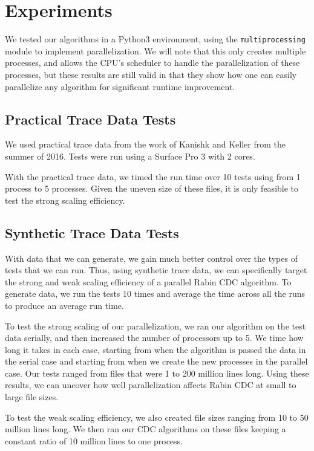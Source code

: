 \documentclass{acmtog} %
\begin{document}
	\section{Experiments}
	We tested our algorithms in a Python3 environment, using the \texttt{multiprocessing} module to implement parallelization. We will note that this only creates multiple processes, and allows the CPU's scheduler to handle the parallelization of these processes, but these results are still valid in that they show how one can easily parallelize any algorithm for significant runtime improvement.
	
	
	
	\subsection{Practical Trace Data Tests}
	We used practical trace data from the work of Kanishk and Keller from the summer of 2016. Tests were run using a Surface Pro 3 with 2 cores.
	
	With the practical trace data, we timed the run time over 10 tests using from 1 process to 5 processes. Given the uneven size of these files, it is only feasible to test the strong scaling efficiency.
	\subsection{Synthetic Trace Data Tests}
	With data that we can generate, we gain much better control over the types of tests that we can run. Thus, using synthetic trace data, we can specifically target the strong and weak scaling efficiency of a parallel Rabin CDC algorithm. To generate data, we run the tests 10 times and average the time across all the runs to produce an average run time. 
	
	To test the strong scaling of our parallelization, we ran our algorithm on the test data serially, and then increased the number of processors up to 5. We time how long it takes in each case, starting from when the algorithm is passed the data in the serial case and starting from when we create the new processes in the parallel case. Our tests ranged from files that were 1 to 200 million lines long. Using these results, we can uncover how well parallelization affects Rabin CDC at small to large file sizes.
	
	To test the weak scaling efficiency, we also created file sizes ranging from 10 to 50 million lines long. We then ran our CDC algorithms on these files keeping a constant ratio of 10 million lines to one process. 
	
\end{document}
